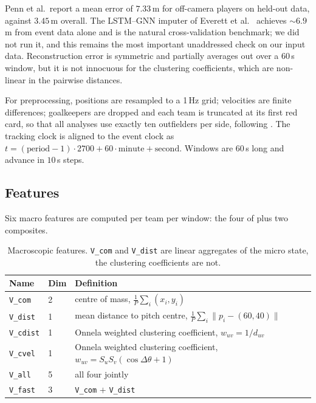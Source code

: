 \documentclass[11pt,a4paper]{article}
\newcommand{\code}[1]{\texttt{\small #1}}
\begin{document}
Penn et al.\ report a mean error of $7.33$\,m for off-camera players on held-out data,
against $3.45$\,m overall. The LSTM--GNN imputer of Everett et al.\ \cite{everett2023}
achieves $\sim6.9$\,m from event data alone and is the natural cross-validation benchmark;
we did not run it, and this remains the most important unaddressed check on our input
data. Reconstruction error is symmetric and partially averages out over a 60\,s window,
but it is not innocuous for the clustering coefficients, which are non-linear in the
pairwise distances.

For preprocessing, positions are resampled to a 1\,Hz grid; velocities are finite
differences; goalkeepers are dropped and each team is truncated at its first red card, so
that all analyses use exactly ten outfielders per side, following \cite{cheng2025}. The
tracking clock is aligned to the event clock as
$t=(\text{period}-1)\cdot2700+60\cdot\text{minute}+\text{second}$. Windows are $60$\,s
long and advance in $10$\,s steps.

\subsection{Features}

Six macro features are computed per team per window: the four of \cite{cheng2025} plus two
composites.

\begin{table}[H]
\centering
\small
\begin{tabular}{@{}llp{7.6cm}@{}}
\toprule
\textbf{Name} & \textbf{Dim} & \textbf{Definition} \\
\midrule
\code{V\_com}   & 2 & centre of mass, $\tfrac1P\sum_i(x_i,y_i)$ \\
\code{V\_dist}  & 1 & mean distance to pitch centre, $\tfrac1P\sum_i\lVert p_i-(60,40)\rVert$ \\
\code{V\_cdist} & 1 & Onnela weighted clustering coefficient, $w_{uv}=1/d_{uv}$ \\
\code{V\_cvel}  & 1 & Onnela weighted clustering coefficient, $w_{uv}=S_uS_v(\cos\Delta\theta+1)$ \\
\code{V\_all}   & 5 & all four jointly \\
\code{V\_fast}  & 3 & \code{V\_com} $+$ \code{V\_dist} \\
\bottomrule
\end{tabular}
\caption{Macroscopic features. \code{V\_com} and \code{V\_dist} are linear aggregates of the micro state, the clustering coefficients are not.}
\label{tab:features}
\end{table}
\end{document}
